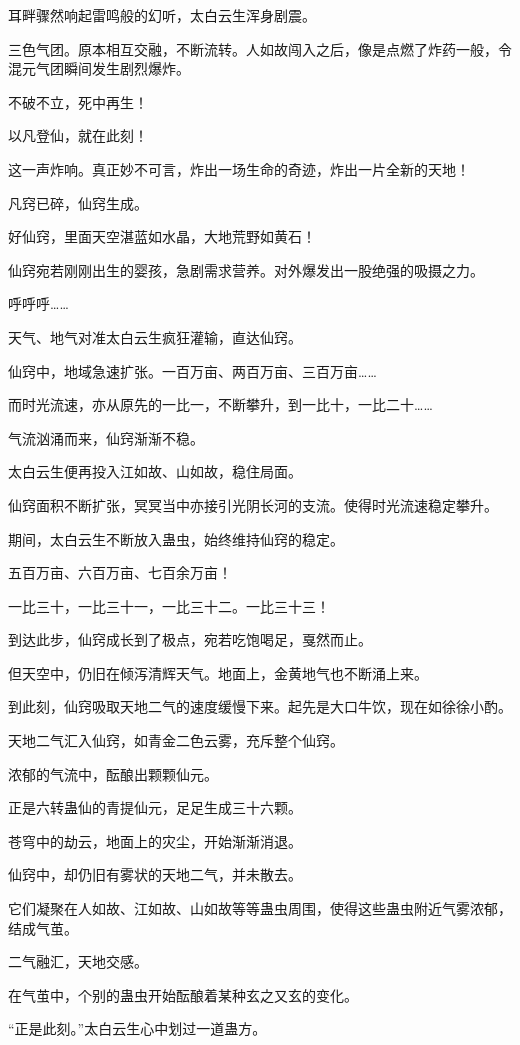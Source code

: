 \begin{this_body}
耳畔骤然响起雷鸣般的幻听，太白云生浑身剧震。

三色气团。原本相互交融，不断流转。人如故闯入之后，像是点燃了炸药一般，令混元气团瞬间发生剧烈爆炸。

不破不立，死中再生！

以凡登仙，就在此刻！

这一声炸响。真正妙不可言，炸出一场生命的奇迹，炸出一片全新的天地！

凡窍已碎，仙窍生成。

好仙窍，里面天空湛蓝如水晶，大地荒野如黄石！

仙窍宛若刚刚出生的婴孩，急剧需求营养。对外爆发出一股绝强的吸摄之力。

呼呼呼……

天气、地气对准太白云生疯狂灌输，直达仙窍。

仙窍中，地域急速扩张。一百万亩、两百万亩、三百万亩……

而时光流速，亦从原先的一比一，不断攀升，到一比十，一比二十……

气流汹涌而来，仙窍渐渐不稳。

太白云生便再投入江如故、山如故，稳住局面。

仙窍面积不断扩张，冥冥当中亦接引光阴长河的支流。使得时光流速稳定攀升。

期间，太白云生不断放入蛊虫，始终维持仙窍的稳定。

五百万亩、六百万亩、七百余万亩！

一比三十，一比三十一，一比三十二。一比三十三！

到达此步，仙窍成长到了极点，宛若吃饱喝足，戛然而止。

但天空中，仍旧在倾泻清辉天气。地面上，金黄地气也不断涌上来。

到此刻，仙窍吸取天地二气的速度缓慢下来。起先是大口牛饮，现在如徐徐小酌。

天地二气汇入仙窍，如青金二色云雾，充斥整个仙窍。

浓郁的气流中，酝酿出颗颗仙元。

正是六转蛊仙的青提仙元，足足生成三十六颗。

苍穹中的劫云，地面上的灾尘，开始渐渐消退。

仙窍中，却仍旧有雾状的天地二气，并未散去。

它们凝聚在人如故、江如故、山如故等等蛊虫周围，使得这些蛊虫附近气雾浓郁，结成气茧。

二气融汇，天地交感。

在气茧中，个别的蛊虫开始酝酿着某种玄之又玄的变化。

“正是此刻。”太白云生心中划过一道蛊方。


\end{this_body}
